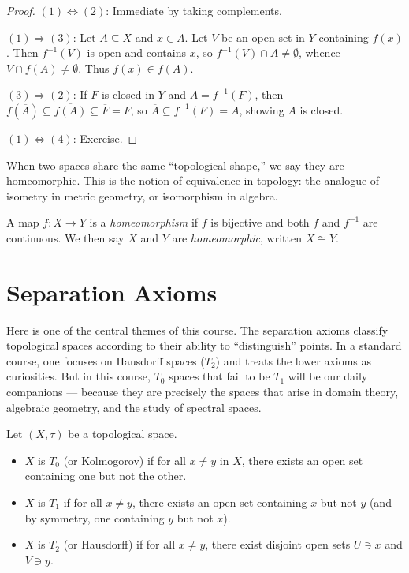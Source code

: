 \begin{proof}
$(1) \Leftrightarrow (2)$: Immediate by taking complements.

$(1) \Rightarrow (3)$: Let $A \subseteq X$ and $x \in \overline{A}$. Let $V$ be an open
set in $Y$ containing $f(x)$. Then $f^{-1}(V)$ is open and contains $x$, so
$f^{-1}(V) \cap A \neq \emptyset$, whence $V \cap f(A) \neq \emptyset$. Thus
$f(x) \in \overline{f(A)}$.

$(3) \Rightarrow (2)$: If $F$ is closed in $Y$ and $A = f^{-1}(F)$, then
$f(\overline{A}) \subseteq \overline{f(A)} \subseteq \overline{F} = F$, so
$\overline{A} \subseteq f^{-1}(F) = A$, showing $A$ is closed.

$(1) \Leftrightarrow (4)$: Exercise.
\end{proof}

When two spaces share the same ``topological shape,'' we say they are
homeomorphic. This is the notion of equivalence in topology: the analogue of
isometry in metric geometry, or isomorphism in algebra.

\begin{definition}[Homeomorphism]
A map $f\colon X \to Y$ is a \emph{homeomorphism} if $f$ is bijective and both $f$ and
$f^{-1}$ are continuous. We then say $X$ and $Y$ are \emph{homeomorphic}, written
$X \cong Y$.
\end{definition}

\section{Separation Axioms}

Here is one of the central themes of this course. The separation axioms
classify topological spaces according to their ability to ``distinguish''
points. In a standard course, one focuses on Hausdorff spaces ($T_2$) and
treats the lower axioms as curiosities. But in this course, $T_0$ spaces
that fail to be $T_1$ will be our daily companions --- because they are
precisely the spaces that arise in domain theory, algebraic geometry, and the
study of spectral spaces.

\begin{definition}[Axioms $T_0$, $T_1$, $T_2$]
Let $(X,\tau)$ be a topological space.
\begin{itemize}
  \item $X$ is \emph{$T_0$} (or Kolmogorov) if for all $x \neq y$ in $X$, there exists an
    open set containing one but not the other.
  \item $X$ is \emph{$T_1$} if for all $x \neq y$, there exists an open set containing $x$
    but not $y$ (and by symmetry, one containing $y$ but not $x$).
  \item $X$ is \emph{$T_2$} (or Hausdorff) if for all $x \neq y$, there exist disjoint
    open sets $U \ni x$ and $V \ni y$.
\end{itemize}
\end{definition}

